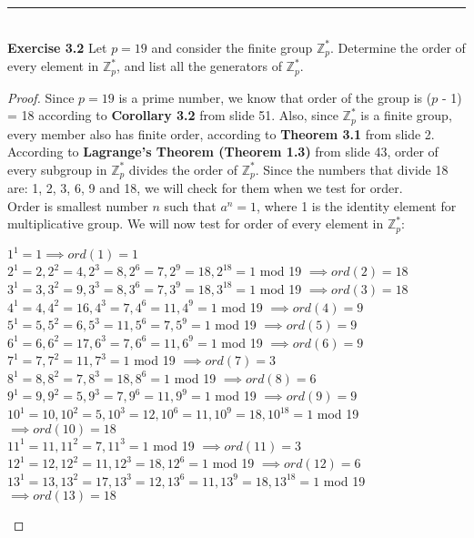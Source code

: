 \documentclass[a4paper]{article}
\begin{document}
\noindent\rule{12cm}{0.4pt}\\
\noindent \textbf{Exercise 3.2} Let $p = 19$ and consider the finite group $\mathbb{Z}^{*}_{p}$. Determine the order of every element in $\mathbb{Z}^{*}_{p}$, and list all the generators of $\mathbb{Z}^{*}_{p}$.
\begin{proof}
Since $p=19$ is a prime number, we know that order of the group is ($p$ - 1) = 18 according to \textbf{Corollary 3.2} from slide 51. Also, since $\mathbb{Z}^{*}_{p}$ is a finite group, every member also has finite order, according to \textbf{Theorem 3.1} from slide 2. According to \textbf{Lagrange's Theorem (Theorem 1.3)} from slide 43, order of every subgroup in $\mathbb{Z}^{*}_{p}$ divides the order of $\mathbb{Z}^{*}_{p}$. Since the numbers that divide 18 are: 1, 2, 3, 6, 9 and 18, we will check for them when we test for order.\\
Order is smallest number $n$ such that $a^n=1$, where 1 is the identity element for multiplicative group. We will now test for order of every element in $\mathbb{Z}^{*}_{p}$:\\
\begin{center}
$1^1 = 1 \implies ord(1) = 1$\\
$2^1 = 2, 2^2 = 4, 2^3 = 8, 2^6 = 7, 2^9 = 18, 2^{18} = 1$ mod 19 $\implies ord(2) = 18$\\
$3^1 = 3, 3^2 = 9, 3^3 = 8, 3^6 = 7, 3^9 = 18, 3^{18} = 1$ mod 19 $\implies ord(3) = 18$\\
$4^1 = 4, 4^2 = 16, 4^3 = 7, 4^6 = 11, 4^9 = 1$ mod 19 $\implies ord(4) = 9$\\
$5^1 = 5, 5^2 = 6, 5^3 = 11, 5^6 = 7, 5^9 = 1$ mod 19 $\implies ord(5) = 9$\\
$6^1 = 6, 6^2 = 17, 6^3 = 7, 6^6 = 11, 6^9 = 1$ mod 19 $\implies ord(6) = 9$\\
$7^1 = 7, 7^2 = 11, 7^3 = 1$ mod 19 $\implies ord(7) = 3$\\
$8^1 = 8, 8^2 = 7, 8^3 = 18, 8^6 = 1$ mod 19 $\implies ord(8) = 6$\\
$9^1 = 9, 9^2 = 5, 9^3 = 7, 9^6 = 11, 9^9 = 1$ mod 19 $\implies ord(9) = 9$\\
$10^1 = 10, 10^2 = 5, 10^3 = 12, 10^6 = 11, 10^9 = 18, 10^{18} = 1$ mod 19 $\implies ord(10) = 18$\\
$11^1 = 11, 11^2 = 7, 11^3 = 1$ mod 19 $\implies ord(11) = 3$\\
$12^1 = 12, 12^2 = 11, 12^3 = 18, 12^6 = 1$ mod 19 $\implies ord(12) = 6$\\
$13^1 = 13, 13^2 = 17, 13^3 = 12, 13^6 = 11, 13^9 = 18, 13^{18} = 1$ mod 19 $\implies ord(13) = 18$\\

\end{center}
\end{proof}
\end{document}
